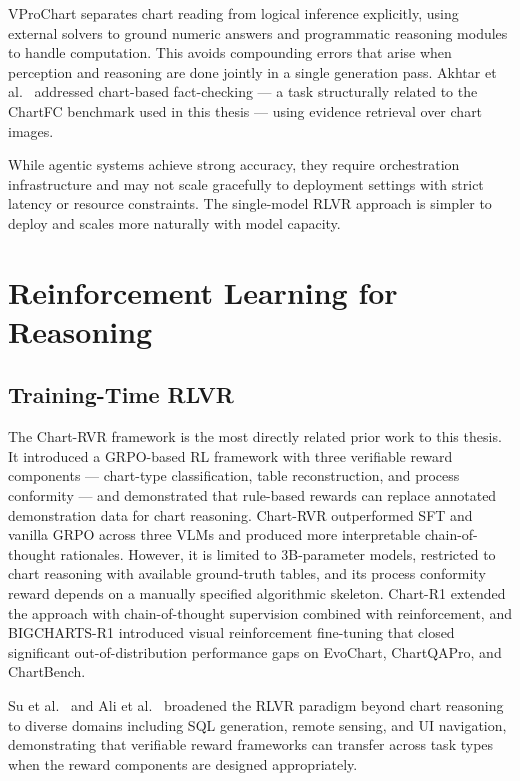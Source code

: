\documentclass{iutbscthesis}
\begin{document}
VProChart \cite{huang2025vprChart} separates chart reading from logical inference explicitly, using external solvers to ground numeric answers and programmatic reasoning modules to handle computation. This avoids compounding errors that arise when perception and reasoning are done jointly in a single generation pass. Akhtar et al.\ \cite{akhtar2023reading} addressed chart-based fact-checking --- a task structurally related to the ChartFC benchmark used in this thesis --- using evidence retrieval over chart images.

While agentic systems achieve strong accuracy, they require orchestration infrastructure and may not scale gracefully to deployment settings with strict latency or resource constraints. The single-model RLVR approach is simpler to deploy and scales more naturally with model capacity.

\section{Reinforcement Learning for Reasoning}

\subsection{Training-Time RLVR}

The Chart-RVR framework \cite{sinha2025chartrvr} is the most directly related prior work to this thesis. It introduced a GRPO-based RL framework with three verifiable reward components --- chart-type classification, table reconstruction, and process conformity --- and demonstrated that rule-based rewards can replace annotated demonstration data for chart reasoning. Chart-RVR outperformed SFT and vanilla GRPO across three VLMs and produced more interpretable chain-of-thought rationales. However, it is limited to 3B-parameter models, restricted to chart reasoning with available ground-truth tables, and its process conformity reward depends on a manually specified algorithmic skeleton. Chart-R1 \cite{chen2025chartr1} extended the approach with chain-of-thought supervision combined with reinforcement, and BIGCHARTS-R1 \cite{masry2025bigchartsr1} introduced visual reinforcement fine-tuning that closed significant out-of-distribution performance gaps on EvoChart, ChartQAPro, and ChartBench.

Su et al.\ \cite{su2025crossing} and Ali et al.\ \cite{ali2025sql} broadened the RLVR paradigm beyond chart reasoning to diverse domains including SQL generation, remote sensing, and UI navigation, demonstrating that verifiable reward frameworks can transfer across task types when the reward components are designed appropriately.
\end{document}
